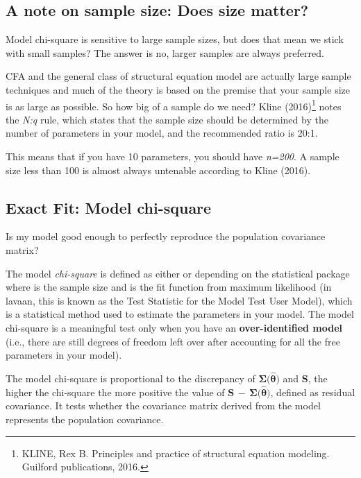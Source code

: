 \documentclass[
]{article}
\begin{document}
\hypertarget{a-note-on-sample-size-does-size-matter}{%
\subsection{A note on sample size: Does size
matter?}\label{a-note-on-sample-size-does-size-matter}}

Model chi-square is sensitive to large sample sizes, but does that mean
we stick with small samples? The answer is no, larger samples are always
preferred.

CFA and the general class of structural equation model are actually
large sample techniques and much of the theory is based on the premise
that your sample size is as large as possible. So how big of a sample do
we need? Kline (2016)\footnote{KLINE, Rex B. Principles and practice of
  structural equation modeling. Guilford publications, 2016.} notes the
\emph{N:q} rule, which states that the sample size should be determined
by the number of parameters in your model, and the recommended ratio is
20:1.

This means that if you have 10 parameters, you should have \emph{n=200}.
A sample size less than 100 is almost always untenable according to
Kline (2016).

\hypertarget{exact-fit-model-chi-square}{%
\subsection{Exact Fit: Model
chi-square}\label{exact-fit-model-chi-square}}

Is my model good enough to perfectly reproduce the population covariance
matrix?

The model \emph{chi-square} is defined as either or depending on the
statistical package where is the sample size and is the fit function
from maximum likelihood (in lavaan, this is known as the Test Statistic
for the Model Test User Model), which is a statistical method used to
estimate the parameters in your model. The model chi-square is a
meaningful test only when you have an \textbf{over-identified model}
(i.e., there are still degrees of freedom left over after accounting for
all the free parameters in your model).

The model chi-square is proportional to the discrepancy of
\(\mathbf{\Sigma{(\hat{\theta}})}\) and \(\mathbf{S}\), the higher the
chi-square the more positive the value of
\(\mathbf{S} \, - \, \mathbf{\Sigma{(\hat{\theta}})}\), defined as
residual covariance. It tests whether the covariance matrix derived from
the model represents the population covariance.
\end{document}
